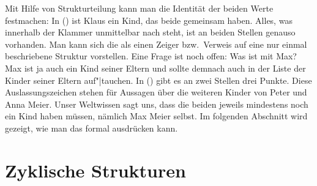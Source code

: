 Mit Hilfe von Strukturteilung kann man die Identität der beiden Werte
festmachen:
\ea
{}
\z
In () ist Klaus ein Kind, das beide gemeinsam haben. Alles, was innerhalb der Klammer unmittelbar
nach  steht, ist an beiden Stellen genauso vorhanden. Man kann sich die 
als einen Zeiger bzw.\ Verweis auf eine %
nur einmal beschriebene Struktur
vorstellen. Eine Frage ist noch offen: Was ist mit Max? Max ist ja auch ein
Kind seiner Eltern und sollte demnach auch in der Liste der Kinder seiner
Eltern auf"|tauchen. In () gibt es an zwei Stellen drei Punkte. Diese Auslassungszeichen stehen für Aussagen
über die weiteren Kinder von Peter und Anna Meier. Unser Weltwissen sagt uns, dass die beiden jeweils mindestens
noch ein Kind haben müssen, nämlich Max Meier selbst. Im folgenden Abschnitt wird gezeigt, wie
man das formal ausdrücken kann.%


\section{Zyklische Strukturen}


